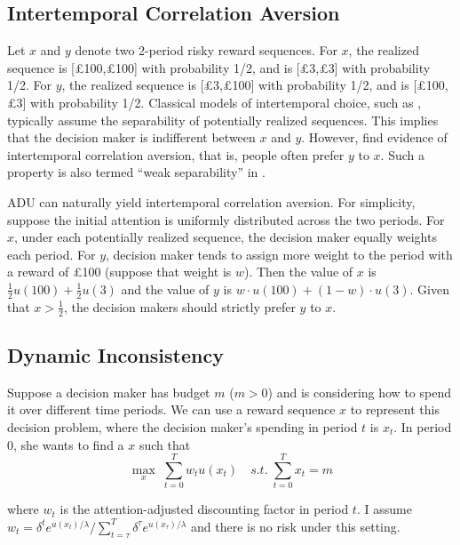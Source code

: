 \documentclass[
  12pt,
]{article}
\begin{document}
\hypertarget{intertemporal-correlation-aversion}{%
\subsection{Intertemporal Correlation
Aversion}\label{intertemporal-correlation-aversion}}

Let \(x\) and \(y\) denote two 2-period risky reward sequences. For
\(x\), the realized sequence is {[}£100,£100{]} with probability 1/2,
and is {[}£3,£3{]} with probability 1/2. For \(y\), the realized
sequence is {[}£3,£100{]} with probability 1/2, and is {[}£100,£3{]}
with probability 1/2. Classical models of intertemporal choice, such as
\citet{fishburn_time_1982}, typically assume the separability of
potentially realized sequences. This implies that the decision maker is
indifferent between \(x\) and \(y\). However,
\citet{andersen_multiattribute_2018} find evidence of intertemporal
correlation aversion, that is, people often prefer \(y\) to \(x\). Such
a property is also termed ``weak separability'' in
\citet{noor_constrained_2023}.

ADU can naturally yield intertemporal correlation aversion. For
simplicity, suppose the initial attention is uniformly distributed
across the two periods. For \(x\), under each potentially realized
sequence, the decision maker equally weights each period. For \(y\),
decision maker tends to assign more weight to the period with a reward
of £100 (suppose that weight is \(w\)). Then the value of \(x\) is
\(\frac{1}{2} u(100) + \frac{1}{2} u(3)\) and the value of \(y\) is
\(w\cdot u(100) +(1-w) \cdot u(3)\). Given that \(x>\frac{1}{2}\), the
decision makers should strictly prefer \(y\) to \(x\).

\hypertarget{dynamic-inconsistency}{%
\subsection{Dynamic Inconsistency}\label{dynamic-inconsistency}}

Suppose a decision maker has budget \(m\) (\(m>0\)) and is considering
how to spend it over different time periods. We can use a reward
sequence \(x\) to represent this decision problem, where the decision
maker's spending in period \(t\) is \(x_t\). In period 0, she wants to
find a \(x\) such that\[ \tag{3}
\max_{x}\;\sum_{t=0}^T w_t u(x_t)\quad s.t. \;\sum_{t=0}^T x_t = m  
\]

where \(w_t\) is the attention-adjusted discounting factor in period
\(t\). I assume
\(w_t=\delta^t e^{u(x_t)/\lambda}/\sum_{t=\tau}^T \delta^{\tau} e^{u(x_\tau)/\lambda}\)
and there is no risk under this setting.
\end{document}
